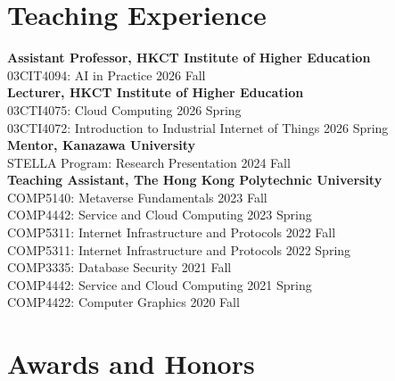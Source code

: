\documentclass{resume}
\begin{document}
\section{Teaching Experience} 
\begin{content}
    {\bf Assistant Professor, HKCT Institute of Higher Education} \hfill {\bf} \\
    03CIT4094: AI in Practice \hfill 2026 Fall \\
    {\bf Lecturer, HKCT Institute of Higher Education} \hfill {\bf} \\
    03CTI4075: Cloud Computing \hfill 2026 Spring \\
    03CTI4072: Introduction to Industrial Internet of Things \hfill 2026 Spring \\
    {\bf Mentor, Kanazawa University} \hfill {\bf} \\
    STELLA Program: Research Presentation \hfill 2024 Fall \\
    {\bf Teaching Assistant, The Hong Kong Polytechnic University} \hfill {\bf} \\
    COMP5140: Metaverse Fundamentals \hfill 2023 Fall \\
    COMP4442: Service and Cloud Computing \hfill 2023 Spring \\
    COMP5311: Internet Infrastructure and Protocols \hfill 2022 Fall \\
    COMP5311: Internet Infrastructure and Protocols \hfill 2022 Spring \\
    COMP3335: Database Security \hfill 2021 Fall \\
    COMP4442: Service and Cloud Computing \hfill 2021 Spring \\
    COMP4422: Computer Graphics \hfill 2020 Fall
\sectionlineskip
\end{content}

\section{Awards and Honors} 
\begin{content}
    
    
    
\sectionlineskip
\end{content}
\end{document}
